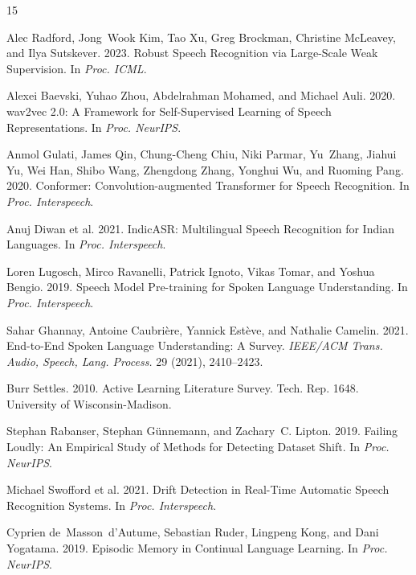 \documentclass[sigconf,authordraft]{acmart}
\begin{document}

\begin{thebibliography}{15}

Alec Radford, Jong~Wook Kim, Tao Xu, Greg Brockman, Christine McLeavey, and Ilya Sutskever. 2023.
\newblock Robust Speech Recognition via Large-Scale Weak Supervision.
\newblock In \emph{Proc. ICML}.

Alexei Baevski, Yuhao Zhou, Abdelrahman Mohamed, and Michael Auli. 2020.
\newblock wav2vec 2.0: A Framework for Self-Supervised Learning of Speech Representations.
\newblock In \emph{Proc. NeurIPS}.

Anmol Gulati, James Qin, Chung-Cheng Chiu, Niki Parmar, Yu~Zhang, Jiahui Yu, Wei Han, Shibo Wang, Zhengdong Zhang, Yonghui Wu, and Ruoming Pang. 2020.
\newblock Conformer: Convolution-augmented Transformer for Speech Recognition.
\newblock In \emph{Proc. Interspeech}.

Anuj Diwan et al. 2021.
\newblock IndicASR: Multilingual Speech Recognition for Indian Languages.
\newblock In \emph{Proc. Interspeech}.

Loren Lugosch, Mirco Ravanelli, Patrick Ignoto, Vikas Tomar, and Yoshua Bengio. 2019.
\newblock Speech Model Pre-training for Spoken Language Understanding.
\newblock In \emph{Proc. Interspeech}.

Sahar Ghannay, Antoine Caubri{\`e}re, Yannick Est{\`e}ve, and Nathalie Camelin. 2021.
\newblock End-to-End Spoken Language Understanding: A Survey.
\newblock \emph{IEEE/ACM Trans. Audio, Speech, Lang. Process.} 29 (2021), 2410--2423.

Burr Settles. 2010.
\newblock Active Learning Literature Survey.
\newblock Tech. Rep. 1648. University of Wisconsin-Madison.

Stephan Rabanser, Stephan G{\"u}nnemann, and Zachary~C. Lipton. 2019.
\newblock Failing Loudly: An Empirical Study of Methods for Detecting Dataset Shift.
\newblock In \emph{Proc. NeurIPS}.

Michael Swofford et al. 2021.
\newblock Drift Detection in Real-Time Automatic Speech Recognition Systems.
\newblock In \emph{Proc. Interspeech}.

Cyprien de~Masson~d'Autume, Sebastian Ruder, Lingpeng Kong, and Dani Yogatama. 2019.
\newblock Episodic Memory in Continual Language Learning.
\newblock In \emph{Proc. NeurIPS}.


\end{thebibliography}
\end{document}
